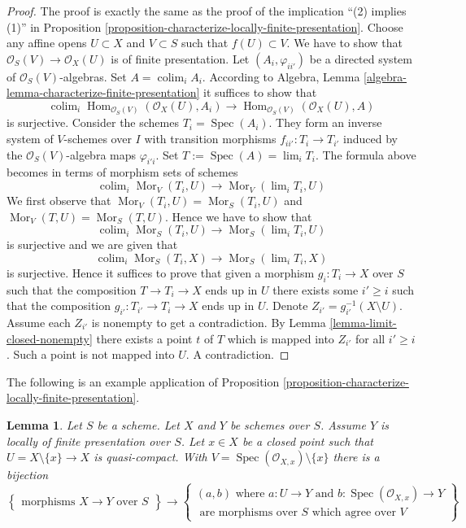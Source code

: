 \documentclass{stacks-project}
\theoremstyle{plain}
\newtheorem{lemma}[subsection]{Lemma}
\theoremstyle{definition}
\theoremstyle{remark}
\numberwithin{equation}{subsection}
\def\lim{\mathop{\mathrm{lim}}\nolimits}
\def\colim{\mathop{\mathrm{colim}}\nolimits}
\def\Spec{\mathop{\mathrm{Spec}}}
\def\Hom{\mathop{\mathrm{Hom}}\nolimits}
\def\Mor{\mathop{\mathrm{Mor}}\nolimits}
\begin{document}
\begin{proof}
The proof is exactly the same as the proof of the implication
``(2) implies (1)'' in
Proposition \ref{proposition-characterize-locally-finite-presentation}.
Choose any affine opens $U \subset X$ and $V \subset S$ such that
$f(U) \subset V$. We have to show that
$\mathcal{O}_S(V) \to \mathcal{O}_X(U)$ is of finite presentation.
Let $(A_i, \varphi_{ii'})$ be a directed system of
$\mathcal{O}_S(V)$-algebras. Set $A = \colim_i A_i$.
According to
Algebra, Lemma \ref{algebra-lemma-characterize-finite-presentation}
it suffices to show that
$$
\colim_i \Hom_{\mathcal{O}_S(V)}(\mathcal{O}_X(U), A_i) \to
\Hom_{\mathcal{O}_S(V)}(\mathcal{O}_X(U), A)
$$
is surjective. Consider the schemes $T_i = \Spec(A_i)$. They
form an inverse system of $V$-schemes over $I$
with transition morphisms $f_{ii'} : T_i \to T_{i'}$
induced by the $\mathcal{O}_S(V)$-algebra maps $\varphi_{i'i}$.
Set $T := \Spec(A) = \lim_i T_i$.
The formula above becomes in terms of morphism sets of schemes
$$
\colim_i \Mor_V(T_i, U) \to \Mor_V(\lim_i T_i, U)
$$
We first observe that
$\Mor_V(T_i, U) = \Mor_S(T_i, U)$
and
$\Mor_V(T, U) = \Mor_S(T, U)$.
Hence we have to show that
$$
\colim_i \Mor_S(T_i, U) \to
\Mor_S(\lim_i T_i, U)
$$
is surjective and we are given that
$$
\colim_i \Mor_S(T_i, X) \to
\Mor_S(\lim_i T_i, X)
$$
is surjective.
Hence it suffices to prove that given a morphism $g_i : T_i \to X$ over $S$
such that the composition $T \to T_i \to X$ ends up in $U$ there exists some
$i' \geq i$ such that the composition $g_{i'} : T_{i'} \to T_i \to X$ ends up
in $U$. Denote $Z_{i'} = g_{i'}^{-1}(X \setminus U)$.
Assume each $Z_{i'}$ is nonempty
to get a contradiction. By Lemma \ref{lemma-limit-closed-nonempty}
there exists a point $t$ of $T$ which is mapped into $Z_{i'}$ for all
$i' \geq i$. Such a point is not mapped into $U$. A contradiction.
\end{proof}

\noindent
The following is an example application of
Proposition \ref{proposition-characterize-locally-finite-presentation}.

\begin{lemma}
\label{lemma-morphism-glueing-near-closed-point}
Let $S$ be a scheme. Let $X$ and $Y$ be schemes over $S$.
Assume $Y$ is locally of finite presentation over $S$.
Let $x \in X$ be a closed point such that
$U = X \setminus \{x\} \to X$ is quasi-compact. With
$V = \Spec(\mathcal{O}_{X, x}) \setminus \{x\}$ there is
a bijection
$$
\left\{
\begin{matrix}
\text{morphisms }X \to Y\text{ over }S
\end{matrix}
\right\}
\longrightarrow
\left\{
\begin{matrix}
(a, b)\text{ where }
a : U \to Y\text{ and }b : \Spec(\mathcal{O}_{X, x}) \to Y\\
\text{ are morphisms over }S
\text{ which agree over }V
\end{matrix}
\right\}
$$
\end{lemma}
\end{document}
